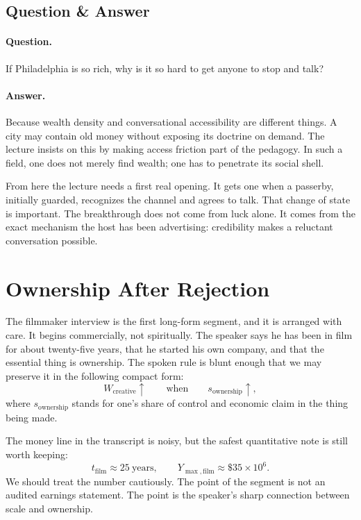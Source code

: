 \subsection{Question \& Answer}

\paragraph{Question.} If Philadelphia is so rich, why is it so hard to get anyone to stop and talk?

\paragraph{Answer.} Because wealth density and conversational accessibility are different things. A city may contain old money without exposing its doctrine on demand. The lecture insists on this by making access friction part of the pedagogy. In such a field, one does not merely find wealth; one has to penetrate its social shell.

From here the lecture needs a first real opening. It gets one when a passerby, initially guarded, recognizes the channel and agrees to talk. That change of state is important. The breakthrough does not come from luck alone. It comes from the exact mechanism the host has been advertising: credibility makes a reluctant conversation possible.

\section{Ownership After Rejection}

The filmmaker interview is the first long-form segment, and it is arranged with care. It begins commercially, not spiritually. The speaker says he has been in film for about twenty-five years, that he started his own company, and that the essential thing is ownership. The spoken rule is blunt enough that we may preserve it in the following compact form:
\begin{equation}
W_{\text{creative}} \uparrow
\qquad \text{when} \qquad
s_{\text{ownership}} \uparrow,
\end{equation}
where \(s_{\text{ownership}}\) stands for one's share of control and economic claim in the thing being made.

The money line in the transcript is noisy, but the safest quantitative note is still worth keeping:
\begin{equation}
t_{\text{film}} \approx 25\ \text{years},
\qquad
Y_{\max,\text{film}} \approx \$35 \times 10^6.
\end{equation}
We should treat the number cautiously. The point of the segment is not an audited earnings statement. The point is the speaker's sharp connection between scale and ownership.

